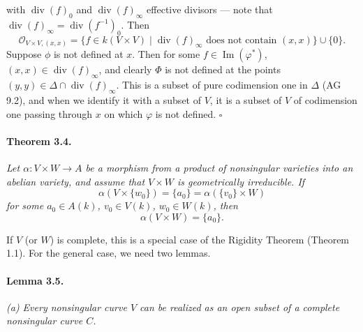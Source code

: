 

\DeclareMathOperator{\Image}{Im}        %
\DeclareMathOperator{\divisor}{div}     %
\DeclareMathOperator{\Tgt}{Tgt}         %


with $\divisor(f)_0$ and $\divisor(f)_{\infty}$ effective divisors --- note
that $\divisor(f)_{\infty} = \divisor(f^{-1})_0$. Then
\[
  \mathcal{O}_{V \times V, (x,x)} = \{ f \in k(V \times V) \mid
    \divisor(f)_{\infty} \text{ does not contain } (x, x) \} \cup \{0\}.
\]
Suppose $\phi$ is not defined at $x$.
Then for some $f \in \Image(\varphi^*)$, $(x, x) \in \divisor(f)_{\infty}$,
and clearly $\Phi$ is not defined at the points
$(y, y) \in \Delta \cap \divisor(f)_{\infty}$. This is a subset of pure
codimension one in $\Delta$ (AG 9.2), and when we identify it with a subset
of $V$, it is a subset of $V$ of codimension one passing through $x$ on
which $\varphi$ is not defined. \hfill $\square$

\paragraph{Theorem 3.4.}
\textit{Let $\alpha \colon V \times W \to A$ be a morphism from a product of
nonsingular varieties into an abelian variety, and assume that $V \times W$
is geometrically irreducible. If}
\[
  \alpha(V \times \{w_0\}) = \{a_0\} = \alpha(\{v_0\} \times W)
\]
\textit{for some $a_0 \in A(k)$, $v_0 \in V(k)$, $w_0 \in W(k)$, then}
\[
  \alpha(V \times W) = \{a_0\}.
\]

If $V$ (or $W$) is complete, this is a special case of the Rigidity Theorem
(Theorem 1.1). For the general case, we need two lemmas.

\paragraph{Lemma 3.5.}
\textit{(a) Every nonsingular curve $V$ can be realized as an open subset of
a complete nonsingular curve $C$.}

